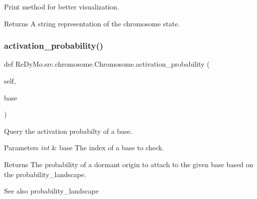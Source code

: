 Print method for better visualization. 

\begin{DoxyReturn}{Returns}
A string representation of the chromosome state. 
\end{DoxyReturn}
\mbox{\label{classReDyMo_1_1src_1_1chromosome_1_1Chromosome_ae1793cc7315be7cffaf4c1ab9385ba89}} 
\subsubsection{\texorpdfstring{activation\+\_\+probability()}{activation\_probability()}}
{\footnotesize\ttfamily def Re\+Dy\+Mo.\+src.\+chromosome.\+Chromosome.\+activation\+\_\+probability (\begin{DoxyParamCaption}\item[{}]{self,  }\item[{}]{base }\end{DoxyParamCaption})}



Query the activation probabilty of a base. 


\begin{DoxyParams}{Parameters}
{\em int} & base The index of a base to check. \\
\hline
\end{DoxyParams}
\begin{DoxyReturn}{Returns}
The probability of a dormant origin to attach to the given base based on the probability\+\_\+landscape. 
\end{DoxyReturn}
\begin{DoxySeeAlso}{See also}
probability\+\_\+landscape 
\end{DoxySeeAlso}
\mbox{\label{classReDyMo_1_1src_1_1chromosome_1_1Chromosome_a1dba7152914a8f8006a5ddfcaad82c31}} 
